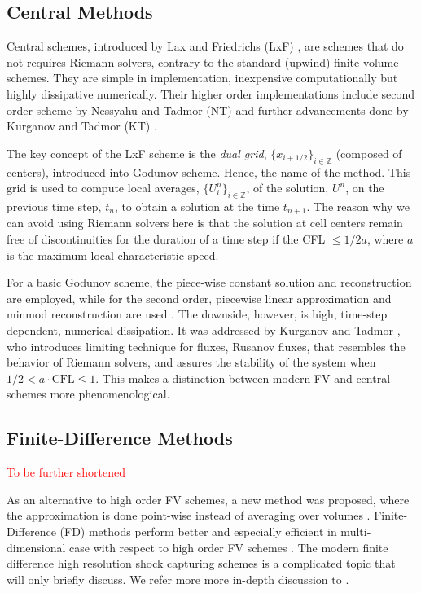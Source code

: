 \documentclass[11pt,a4paper,headinclude=true,DIV=14,BCOR=8mm,chapterprefix,listof=totoc,twoside,openright,abstracton]{scrbook}
\newcommand{\red}[1]{\textcolor{red}{#1}}
\begin{document}
\subsection{Central Methods}

Central schemes, introduced by Lax and Friedrichs (LxF) \cite{Lax:1954,Friedrichs:1954}, are schemes that do not requires Riemann solvers, contrary to the standard (upwind) finite volume schemes. They are simple in implementation, inexpensive computationally but highly dissipative numerically. Their higher order implementations include second order scheme by Nessyahu and Tadmor (NT) \cite{Nessyahu:1990} and further advancements done by Kurganov and Tadmor (KT) \cite{Kurganov:2000}. 

The key concept of the LxF scheme is the \textit{dual grid}, $\{x_{i+1/2}\}_{i\in\mathbb{Z}}$ (composed of centers), introduced into Godunov scheme. Hence, the name of the method. This grid is used to compute local averages, $\{U_{i}^{n}\}_{i\in \mathbb{Z}}$, of the solution, $U^n$, on the previous time step, $t_n$, to obtain a solution at the time $t_{n+1}$. The reason why we can avoid using Riemann solvers here is that the solution at cell centers remain free of discontinuities for the duration of a time step if the CFL $\leq 1/2 a$, where $a$ is the maximum local-characteristic speed. 

For a basic Godunov scheme, the piece-wise constant solution and reconstruction are employed, while for the second order, piecewise linear approximation and minmod reconstruction are used \cite{Nessyahu:1990}. The downside, however, is high, time-step dependent, numerical dissipation. It was addressed by Kurganov and Tadmor \cite{Kurganov:2000}, who introduces limiting technique for fluxes, Rusanov fluxes, that resembles the behavior of Riemann solvers, and assures the stability of the system when $1/2 < a \cdot \text{CFL} \leq 1$. This makes a distinction between modern FV and central schemes more phenomenological. 


\subsection{Finite-Difference Methods}
\red{To be further shortened}

As an alternative to high order FV schemes, a new method was proposed, where the approximation is done point-wise instead of averaging over volumes \cite{Shu:1988,Shu:1989,Jiang:1996}. Finite-Difference (FD) methods perform better and especially efficient in multi-dimensional case with respect to high order FV schemes \cite{Shu:1999,Shu:2003}. The modern finite difference high resolution shock capturing schemes is a complicated topic that will only briefly discuss. We refer more more in-depth discussion to \cite{Shu:1999,Mignone:2010}.
\end{document}
